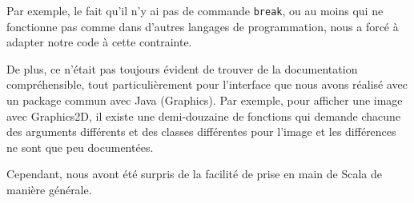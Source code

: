 \documentclass[10pt,a4paper]{article}
\begin{document}
Par exemple, le fait qu'il n'y ai pas de commande \texttt{break}, ou au moins qui ne fonctionne pas comme dans d'autres langages de programmation, nous a forcé à adapter notre code à cette contrainte.

De plus, ce n'était pas toujours évident de trouver de la documentation compréhensible, tout particulièrement pour l'interface que nous avons réalisé avec un package commun avec Java (Graphics). Par exemple, pour afficher une image avec Graphics2D, il existe une demi-douzaine de fonctions qui demande chacune des arguments différents et des classes différentes pour l'image et les différences ne sont que peu documentées.

Cependant, nous avont été surpris de la facilité de prise en main de Scala de manière générale.

\newpage

%
\end{document}
